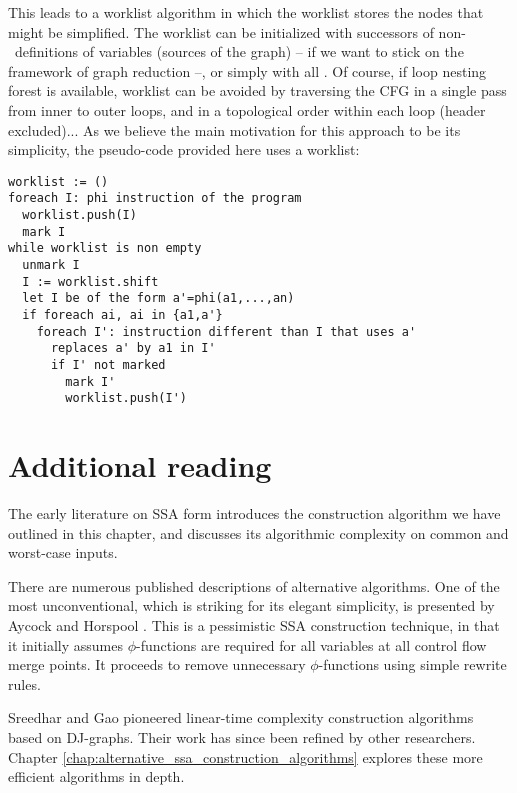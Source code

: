This leads to a worklist algorithm in which the worklist stores the nodes that might be simplified. The worklist can be initialized with successors of non-\phiops\ definitions of variables (sources of the graph) -- if we want to stick on the framework of graph reduction --, or simply with all \phiops. Of course, if loop nesting forest is available, worklist can be avoided by traversing the CFG in a single pass from inner to outer loops, and in a topological order within each loop (header excluded)... 
As we believe the main motivation for this approach to be its simplicity, the pseudo-code provided here uses a worklist:

\begin{verbatim}
worklist := ()
foreach I: phi instruction of the program
  worklist.push(I)
  mark I
while worklist is non empty
  unmark I
  I := worklist.shift
  let I be of the form a'=phi(a1,...,an)
  if foreach ai, ai in {a1,a'}
    foreach I': instruction different than I that uses a'
      replaces a' by a1 in I'
      if I' not marked
        mark I'
        worklist.push(I')
\end{verbatim}


\section{Additional reading}

The early literature on SSA form
\cite{cytron89efficiently,cytron91efficiently}
introduces the construction algorithm we have outlined in this chapter,
and discusses its algorithmic complexity on common and worst-case inputs.

There are numerous published descriptions of alternative algorithms.
One of the most unconventional, which is striking for its elegant simplicity,
is presented by Aycock
and Horspool \cite{aycock00simple}. 
This is a pessimistic SSA construction technique,
in that it initially assumes $\phi$-functions are required
for all variables at all control flow merge points. 
It proceeds to remove unnecessary $\phi$-functions 
using simple rewrite rules.

Sreedhar and Gao \cite{sreedhar95linear} pioneered
linear-time complexity construction algorithms based on DJ-graphs.
Their work has since been refined by other researchers.
Chapter \ref{chap:alternative_ssa_construction_algorithms}
explores these more efficient algorithms in depth.


